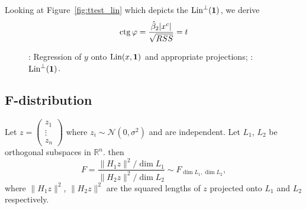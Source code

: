 Looking at Figure~\ref{fig:ttest_lin} which depicts the $\operatorname{Lin}^{\perp}(\mathbf{1})$,
we derive
\[
\operatorname{ctg} \varphi = \frac{\hat \beta_2 \vert x^c \vert}{\sqrt{RSS}} = t
\]

\begin{figure}[ht!]
\begin{center}
\caption{: Regression of $y$ onto $\operatorname{Lin}(x, \mathbf{1})$ and appropriate projections;
: $\operatorname{Lin}^{\perp}(\mathbf{1})$.}
\end{center}
\end{figure}


\subsection{F-distribution}


\begin{definition}\label{def:f}
Let $z = \begin{pmatrix} z_1 \\ \vdots \\ z_n \end{pmatrix}$
where $z_i \sim \mathcal{N}(0, \sigma^2)$ and are independent.
Let $L_1$, $L_2$ be orthogonal subspaces in $\mathbb{R}^n$.
then
\[
F = \frac{\lVert H_1 z \rVert^2 / \dim L_1}{\lVert H_2 z \rVert^2 / \dim L_2} \sim F_{\dim L_1, \dim L_2},
\]
where $\lVert H_1 z \rVert^2$, $\lVert H_2 z \rVert^2$ are the squared lengths
of $z$ projected onto $L_1$ and $L_2$ respectively.
\end{definition}

